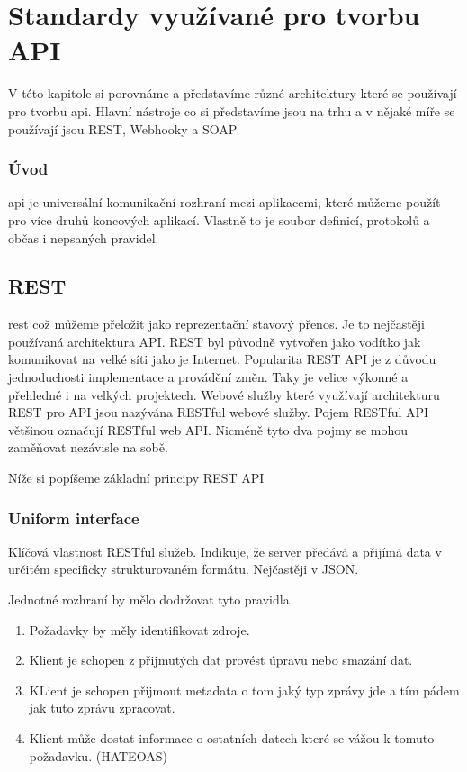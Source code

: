 \chapter{Standardy využívané pro tvorbu API}
V této kapitole si porovnáme a představíme různé architektury které se používají pro tvorbu \gls{api}.
Hlavní nástroje co si představíme jsou na trhu a v nějaké míře se používají jsou REST, Webhooky a SOAP

\subsection*{Úvod}
\gls{api} je universální komunikační rozhraní mezi aplikacemi, které můžeme použít pro více druhů koncových aplikací. Vlastně to je soubor definicí, protokolů a občas i nepsaných pravidel.

\section{REST}
\gls{rest} což můžeme přeložit jako reprezentační stavový přenos. Je to nejčastěji používaná architektura API. REST byl původně vytvořen jako vodítko jak komunikovat na velké síti jako je Internet. Popularita REST API je z důvodu jednoduchosti implementace a provádění změn. Taky je velice výkonné a přehledné i na velkých projektech.
Webové služby které využívají architekturu REST pro API jsou nazývána RESTful webové služby. Pojem RESTful API většinou označují RESTful web API. Nicméně tyto dva pojmy se mohou zaměňovat nezávisle na sobě.

Níže si popíšeme základní principy REST API

\subsection{Uniform interface}
Klíčová vlastnost RESTful služeb. Indikuje, že server předává a přijímá data v určitém specificky strukturovaném formátu. Nejčastěji v JSON.

Jednotné rozhraní by mělo dodržovat tyto pravidla\
\begin{enumerate}
	\item Požadavky by měly identifikovat zdroje.
	\item Klient je schopen z přijmutých dat provést úpravu nebo smazání dat.
	\item KLient je schopen přijmout metadata o tom jaký typ zprávy jde a tím pádem jak tuto zprávu zpracovat.
	\item Klient může dostat informace o ostatních datech které se vážou k tomuto požadavku. (HATEOAS)
\end{enumerate}


